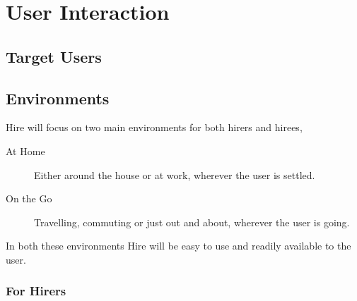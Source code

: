 \documentclass[11pt]{article}
\begin{document}
\section{User Interaction}\label{user-interaction}

\subsection{Target Users}


\subsection{Environments}



Hire will focus on two main environments for both hirers and hirees,

\begin{description}
    \item[At Home] Either around the house or at work, wherever the user is settled.
    \item[On the Go] Travelling, commuting or just out and about, wherever the user is going.
\end{description}

In both these environments Hire will be easy to use and readily available to the user.

\subsubsection{For Hirers}
\end{document}
